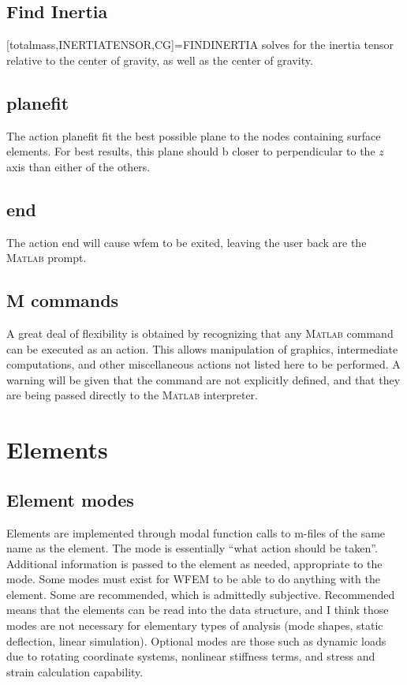 \documentclass[12pt]{article}
\newcommand*{\command}[1]{\textsf{#1}}
\begin{document}
\subsection{Find Inertia}
[totalmass,INERTIATENSOR,CG]=FINDINERTIA solves for the inertia tensor
  relative to the center of gravity, as well as the center of gravity.

\subsection{planefit}
The action \command{planefit} fit the best possible plane to the nodes containing surface elements. For best results, this plane should b closer to perpendicular to the $z$ axis than either of the others.
\subsection{end}
The action \command{end} will cause wfem to be exited, leaving the user back are the M\textsc{atlab} prompt. 
\subsection{M commands}
A great deal of flexibility is obtained by recognizing that any M\textsc{atlab} command can be executed as an action. This allows manipulation of graphics, intermediate computations, and other miscellaneous actions not listed here to be performed. A warning will be given that the command are not explicitly defined, and that they are being passed directly to the M\textsc{atlab} interpreter. 

\section{Elements}\label{sec:elements}

\subsection{Element modes}
Elements are implemented through modal function calls to m-files of
the same name as the element. The mode is essentially ``what action
should be taken''. Additional information is passed to the element as
needed, appropriate to the mode. Some modes must exist for WFEM to be
able to do anything with the element. Some are recommended, which is
admittedly subjective. Recommended means that the elements can be read
into the data structure, and I think those modes are not necessary for
elementary types of analysis (mode shapes, static deflection, linear
simulation). Optional modes are those such as dynamic loads due to
rotating coordinate systems, nonlinear stiffness terms, and stress and
strain calculation capability.
\end{document}
